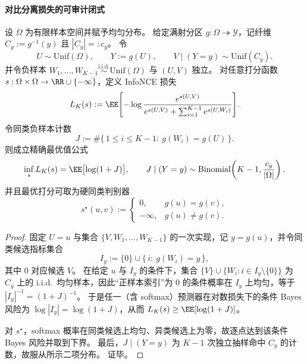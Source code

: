 \paragraph{对比分离损失的可审计闭式}
\begin{theorem}\label{thm:pom-infonce-partition-optimal-closed-form}
设 \(\Omega\) 为有限样本空间并赋予均匀分布。
给定满射分区 \(g:\Omega\twoheadrightarrow\mathcal Y\)，记纤维 \(C_y:=g^{-1}(y)\) 且 \(|C_y|=:c_y\)。
令
\[
U\sim\mathrm{Unif}(\Omega),\qquad Y:=g(U),
\qquad
V\mid (Y=y)\sim \mathrm{Unif}(C_y).
\]
并令负样本 \(W_1,\dots,W_{K-1}\stackrel{\mathrm{i.i.d.}}{\sim}\mathrm{Unif}(\Omega)\) 与 \((U,V)\) 独立。
对任意打分函数 \(s:\Omega\times\Omega\to\RR\cup\{-\infty\}\)，定义 InfoNCE 损失
\[
L_K(s):=\EE\Biggl[-\log\frac{e^{s(U,V)}}{e^{s(U,V)}+\sum_{i=1}^{K-1}e^{s(U,W_i)}}\Biggr].
\]
令同类负样本计数
\[
J:=\#\{\,1\le i\le K-1:\ g(W_i)=g(U)\,\}.
\]
则成立精确最优值公式
\[
\inf_{s}L_K(s)=\EE\bigl[\log(1+J)\bigr],
\qquad
J\mid(Y=y)\sim \mathrm{Binomial}\!\left(K-1,\frac{c_y}{|\Omega|}\right).
\]
并且最优打分可取为硬同类判别器
\[
s^\star(u,v):=
\begin{cases}
0,& g(u)=g(v),\\
-\infty,& g(u)\neq g(v).
\end{cases}
\]
\end{theorem}
\begin{proof}
固定 \(U=u\) 与集合 \(\{V,W_1,\dots,W_{K-1}\}\) 的一次实现，记 \(y=g(u)\)，并令同类候选指标集合
\[
I_y:=\{0\}\cup\{\,i:\ g(W_i)=y\,\},
\]
其中 \(0\) 对应候选 \(V\)。
在给定 \(u\) 与 \(I_y\) 的条件下，集合 \(\{V\}\cup\{W_i:i\in I_y\setminus\{0\}\}\) 为 \(C_y\) 上的 i.i.d.\ 均匀样本，因此“正样本索引”为 \(0\) 的条件概率在 \(I_y\) 上均匀，等于 \(|I_y|^{-1}=(1+J)^{-1}\)。
于是任一（含 softmax）预测器在对数损失下的条件 Bayes 风险为 \(\log|I_y|=\log(1+J)\)，从而
\(
L_K(s)\ge \EE[\log(1+J)]
\)。
\par
对 \(s^\star\)，softmax 概率在同类候选上均匀、异类候选上为零，故逐点达到该条件 Bayes 风险并取到下界。
最后，\(J\mid(Y=y)\) 为 \(K-1\) 次独立抽样命中 \(C_y\) 的计数，故服从所示二项分布。
证毕。
\end{proof}

